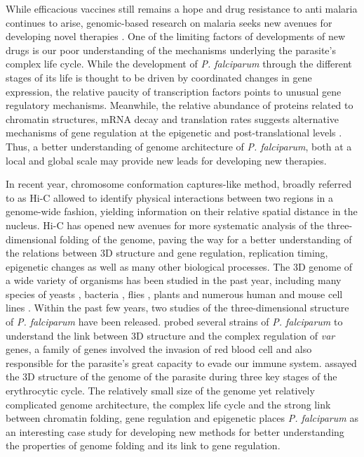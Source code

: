 \documentclass[letterpaper,12pt]{article}
\begin{document}
While efficacious vaccines still remains a hope and drug resistance to anti
malaria continues to arise, genomic-based research on malaria seeks new
avenues for developing novel therapies \citep{kirchner:recent}. One of the
limiting factors of developments of new drugs is our poor understanding of the
mechanisms underlying the parasite's complex life cycle. While the development
of {\em P. falciparum} through the different stages of its life is thought to
be driven by coordinated changes in gene expression, the relative paucity of
transcription factors points to unusual gene regulatory mechanisms. Meanwhile,
the relative abundance of proteins related to chromatin structures, mRNA decay
and translation rates suggests alternative mechanisms of gene regulation at
the epigenetic and post-translational levels \citep{cui:chromatin-mediated,
duffy:role, hoeijmakers:placing, horrocks:control, deitsch:mechanisms}. Thus,
a better understanding of genome architecture of {\em P. falciparum}, both at
a local and global scale may provide new leads for developing new therapies.

In recent year, chromosome conformation captures-like method, broadly referred
to as Hi-C allowed to identify physical interactions between two regions in a
genome-wide fashion, yielding information on their relative spatial distance
in the nucleus. Hi-C has opened new avenues for more systematic analysis of
the three-dimensional folding of the genome, paving the way for a better
understanding of the relations between 3D structure and gene regulation,
replication timing, epigenetic changes as well as many other biological
processes. The 3D genome of a wide variety of organisms has been studied in
the past year, including many species of yeasts \citep{duan:three-dimensional,
burton:species-level, mizuguchi:cohesin-dependent}, bacteria
\citep{umbarger:three-dimensional}, flies \citep{sexton:three-dimensional},
plants \citep{feng:genome-wide, wang:genome-wide} and numerous human and mouse
cell lines \citep{lieberman-aiden:comprehensive, rao:3D}. Within the past few
years, two studies of the three-dimensional structure of {\em P. falciparum}
have been released.  \citet{lemieux:genome-wide} probed several strains of
{\em P. falciparum} to understand the link between 3D structure and the
complex regulation of \textit{var} genes, a family of genes involved the
invasion of red blood cell and also responsible for the parasite's great
capacity to evade our immune system. \citet{ay:three-dimensional} assayed the
3D structure of the genome of the parasite during three key stages of the
erythrocytic cycle. The relatively small size of the genome yet relatively
complicated genome architecture, the complex life cycle and the strong link
between chromatin folding, gene regulation and epigenetic places {\em P.
falciparum} as an interesting case study for developing new methods for better
understanding the properties of genome folding and its link to gene
regulation.
\end{document}
